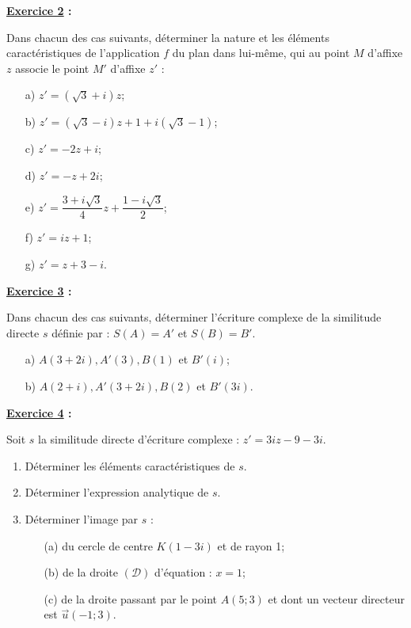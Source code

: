 \documentclass[12pt,a4paper]{article}
\begin{document}
\textbf{\underline{Exercice 2} :}

\bigskip

Dans chacun des cas suivants, déterminer la nature et les éléments caractéristiques de l’application \( f \) du plan dans lui-même, qui au point \( M \) d’affixe \( z \) associe le point \( M' \) d’affixe \( z' \) :

\begin{enumerate}
    \item[a)] \( z' = (\sqrt{3} + i)z \);
    \item[b)] \( z' = (\sqrt{3} - i)z + 1 + i(\sqrt{3} - 1) \);
    \item[c)] \( z' = -2z + i \);
    \item[d)] \( z' = -z + 2i \);
    \item[e)] \( z' = \dfrac{3 + i\sqrt{3}}{4}z + \dfrac{1 - i\sqrt{3}}{2} \);
    \item[f)] \( z' = iz + 1 \);
    \item[g)] \( z' = z + 3 - i \).
\end{enumerate}

\textbf{\underline{Exercice 3} :}

\bigskip

Dans chacun des cas suivants, déterminer l’écriture complexe de la similitude directe \( s \) définie par :  
\( S(A) = A' \) et \( S(B) = B' \).

\begin{itemize}
    \item[a)] \( A(3+2i), A'(3), B(1) \) et \( B'(i) \);
    \item[b)] \( A(2+i), A'(3+2i), B(2) \) et \( B'(3i) \).
\end{itemize}

\bigskip

\textbf{\underline{Exercice 4} :}

\bigskip

Soit \( s \) la similitude directe d’écriture complexe :  \( z' = 3iz - 9 - 3i. \)

\begin{enumerate}
    \item Déterminer les éléments caractéristiques de \( s \).
    \item Déterminer l’expression analytique de \( s \).
    \item Déterminer l’image par \( s \) :
    \begin{enumerate}
        \item[(a)] du cercle de centre \( K(1 - 3i) \) et de rayon 1;
        \item[(b)] de la droite \( (\mathscr{D}) \) d’équation : \( x = 1 \);
        \item[(c)] de la droite passant par le point \( A(5;3) \) et dont un vecteur directeur est \( \vec{u}(-1;3) \).
    \end{enumerate}
\end{enumerate}
\end{document}
